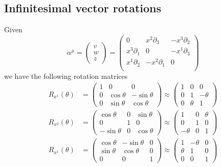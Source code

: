 \documentclass{article}
\begin{document}
 			\subsection{Infinitesimal vector rotations}
 			Given
 			$$
 			\alpha^\mu = 
 			\begin{pmatrix}
 				v\\
 				w\\
 				z
 			\end{pmatrix} =
 			\begin{pmatrix}
 				0 & x^2 \partial_3  & - x^3 \partial_2 \\
 				x^3 \partial_1 & 0 & - x^1 \partial_3 \\
 				x^1 \partial_2  &- x^2 \partial_1 & 0 \\
 			\end{pmatrix}
			$$
			we have the following rotation matrices 
			\begin{align*}
				R_{x^1}(\theta) &= 
					\begin{pmatrix}
						1		&		0		&		0		\\
						0		&	\cos \theta		&	-\sin \theta		\\
						0		&	\sin \theta		&	\cos \theta
					\end{pmatrix}
					\approx
					\begin{pmatrix}
						1		&		0		&		0		\\
						0		&	1		&	 -\theta		\\
						0		&	\theta		&	 1
					\end{pmatrix} \\
				R_{x^2} (\theta) &= 
					\begin{pmatrix}
						\cos \theta	&		0		&	\sin \theta		\\
						0		&		1		&	0			\\
						-\sin \theta	&		0		&	\cos \theta
					\end{pmatrix}
					\approx
					\begin{pmatrix}
						1		&		0		&		\theta		\\
						0		&	1		&	 0		\\
						-\theta		&	0		&	 1
					\end{pmatrix} \\
				R_{x^1}(\theta) &= 
					\begin{pmatrix}
						\cos \theta	&	-\sin \theta		&		0		\\
						\sin \theta		&	\cos \theta		&	0		\\
						0		&	0		&	1
					\end{pmatrix}
					\approx
					\begin{pmatrix}
						1		&		-\theta		&		0		\\
						\theta		&	1		&	 0		\\
						0		&	0		&	 1
					\end{pmatrix} 
			\end{align*}
\end{document}
